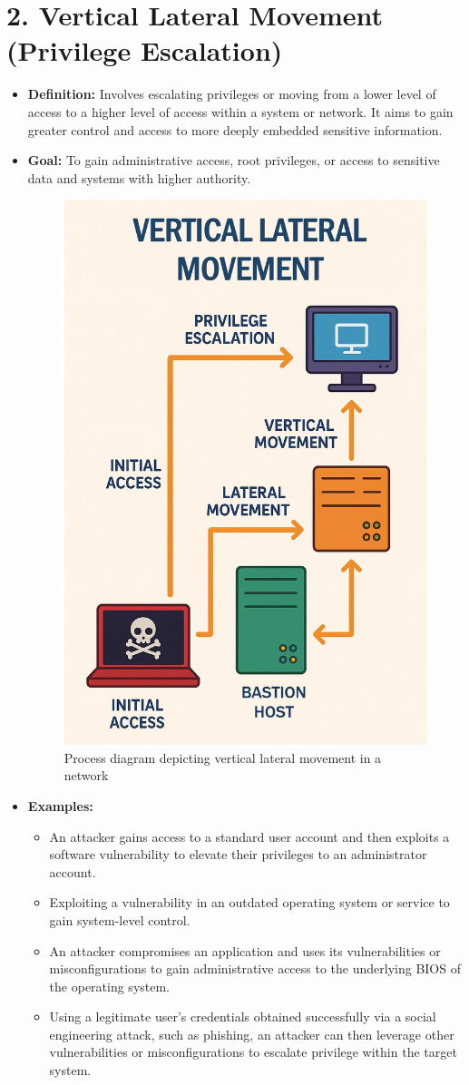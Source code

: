 \section{2. Vertical Lateral Movement (Privilege Escalation)}
\begin{itemize}
    \item \textbf{Definition:} Involves escalating privileges or moving from a lower level of access to a higher level of access within a system or network. It aims to gain greater control and access to more deeply embedded sensitive information.
    \item \textbf{Goal:} To gain administrative access, root privileges, or access to sensitive data and systems with higher authority.


\begin{figure}[h]
    \centering
    \includegraphics[width=0.5\linewidth]{vertical-movement.png}
    \caption{Process diagram depicting vertical lateral movement in a network}
    \label{fig:placeholder}
\end{figure}

    \item \textbf{Examples:}
    \begin{itemize}
        \item An attacker gains access to a standard user account and then exploits a software vulnerability to elevate their privileges to an administrator account.
        \item Exploiting a vulnerability in an outdated operating system or service to gain system-level control.
        \item An attacker compromises an application and uses its vulnerabilities or misconfigurations to gain administrative access to the underlying BIOS of the operating system.
        \item Using a legitimate user's credentials obtained successfully via a social engineering attack, such as phishing, an attacker can then leverage other vulnerabilities or misconfigurations to escalate privilege within the target system.


\end{itemize}
\end{itemize}
